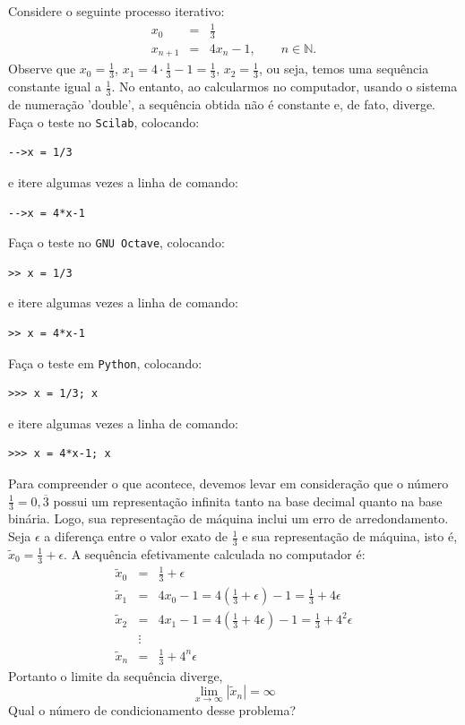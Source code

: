 \begin{ex} Considere o seguinte processo iterativo:
  \begin{eqnarray*}
    x_0 &=& \frac{1}{3}\\
    x_{n+1} &=& 4x_n-1,\qquad n\in\mathbb{N}.
  \end{eqnarray*}
Observe que $x_0=\frac{1}{3}$, $x_1=4\cdot \frac{1}{3}-1=\frac{1}{3}$, $x_2=\frac{1}{3}$, ou seja, temos uma sequência constante igual a $\frac{1}{3}$. No entanto, ao calcularmos no computador, usando o sistema de numeração 'double', a sequência obtida não é constante e, de fato, diverge.
\ifisscilab
Faça o teste no \verb+Scilab+, colocando:
\begin{verbatim}
-->x = 1/3
\end{verbatim}
e itere algumas vezes a linha de comando:
\begin{verbatim}
-->x = 4*x-1
\end{verbatim}
\fi
\ifisoctave
Faça o teste no \verb+GNU Octave+, colocando:
\begin{verbatim}
>> x = 1/3
\end{verbatim}
e itere algumas vezes a linha de comando:
\begin{verbatim}
>> x = 4*x-1
\end{verbatim}
\fi
\ifispython
Faça o teste em \verb+Python+, colocando:
\begin{verbatim}
>>> x = 1/3; x
\end{verbatim}
e itere algumas vezes a linha de comando:
\begin{verbatim}
>>> x = 4*x-1; x
\end{verbatim}
\fi

Para compreender o que acontece, devemos levar em consideração que o número $\frac{1}{3}=0,\overline{3}$ possui um representação infinita tanto na base decimal quanto na base binária. Logo, sua representação de máquina inclui um erro de arredondamento. Seja $\epsilon$ a diferença entre o valor exato de $\frac{1}{3}$ e sua representação de máquina, isto é, $\tilde{x}_0=\frac{1}{3}+\epsilon$. A sequência efetivamente calculada no computador é:
\begin{eqnarray*}
\tilde{x}_0&=&\frac{1}{3}+\epsilon\\
\tilde{x}_1&=&4x_0-1=4\left(\frac{1}{3}+\epsilon\right)-1=\frac{1}{3}+4\epsilon\\
\tilde{x}_2&=&4x_1-1=4\left(\frac{1}{3}+4\epsilon\right)-1=\frac{1}{3}+4^2\epsilon\\
&\vdots&\\
\tilde{x}_n&=&\frac{1}{3}+4^n\epsilon
\end{eqnarray*}
Portanto o limite da sequência diverge,
\begin{equation*}
\lim_{x\to\infty}|\tilde{x}_n|=\infty  
\end{equation*}
Qual o número de condicionamento desse problema?
\end{ex}



